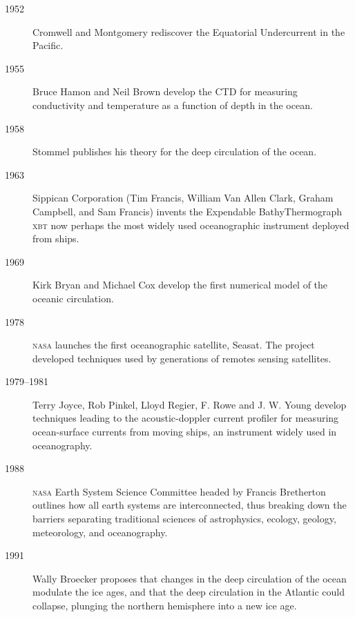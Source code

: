 \begin{description}
\item[1952] Cromwell and Montgomery rediscover the Equatorial
  Undercurrent in the Pacific. \vspace{-1.0ex}

\item[1955] Bruce Hamon and Neil Brown develop the CTD for
  measuring conductivity and temperature as a function of depth in the
  ocean.
\vspace{-1.0ex} 

\item[1958] Stommel publishes his theory for the deep circulation of
  the ocean.
\vspace{-1.0ex}

\item[1963] Sippican Corporation (Tim Francis, William Van Allen
  Clark, Graham Campbell, and Sam Francis) invents the Expendable
  BathyThermograph \textsc{xbt} now perhaps the most widely used
  oceanographic instrument deployed from ships.
\vspace{-1.0ex}

\item[1969] Kirk Bryan and Michael Cox develop the first numerical
  model of the oceanic circulation.
\vspace{-1.0ex} 

\item[1978] \textsc{nasa} launches the first oceanographic satellite,
  Seasat. The project developed techniques used by generations of
  remotes sensing satellites.
\vspace{-1.0ex}

\item[1979--1981] Terry Joyce, Rob Pinkel, Lloyd Regier, F. Rowe and
  J. W. Young develop techniques leading to the acoustic-doppler
  current profiler for measuring ocean-surface currents from moving
  ships, an instrument widely used in oceanography.
\vspace{-1.0ex}

\item[1988] \textsc{nasa} Earth System Science Committee headed by
  Francis Bretherton outlines how all earth systems are
  interconnected, thus breaking down the barriers separating
  traditional sciences of astrophysics, ecology, geology, meteorology,
  and oceanography.

\item[1991] Wally Broecker proposes that changes in the deep
  circulation of the ocean modulate the ice ages, and that the deep
  circulation in the Atlantic could collapse, plunging the northern
  hemisphere into a new ice age.
\vspace{-1.0ex}


\end{description}
